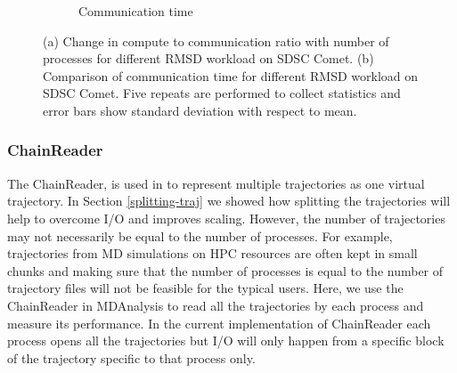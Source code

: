 \begin{figure}[ht!]
\begin{subfigure}{.4\textwidth}
  \caption{Communication time}
  \label{fig:MPItottime-chain-reader}
\end{subfigure}
\caption{(a) Change in compute to communication ratio with number of processes for different RMSD workload on SDSC Comet. 
(b) Comparison of communication time for different RMSD workload on SDSC Comet.
Five repeats are performed to collect statistics and error bars show standard deviation with respect to mean.}
\label{fig:tcom_tcomm_effect}
\end{figure}

\subsubsection{ChainReader}
The ChainReader, is used in  to represent multiple trajectories as one virtual trajectory. 
In Section \ref{splitting-traj} we showed how splitting the trajectories will help to overcome I/O and improves scaling. 
However, the number of trajectories may not necessarily be equal to the number of processes.
For example, trajectories from MD simulations on HPC resources are often kept in small chunks and making sure that the number of processes is equal to the number of trajectory files will not be feasible for the typical users. 
Here, we use the ChainReader in MDAnalysis to read all the trajectories by each process and measure its performance. 
In the current implementation of ChainReader each process opens all the trajectories but I/O will only happen from a specific block of the trajectory specific to that process only.
 
